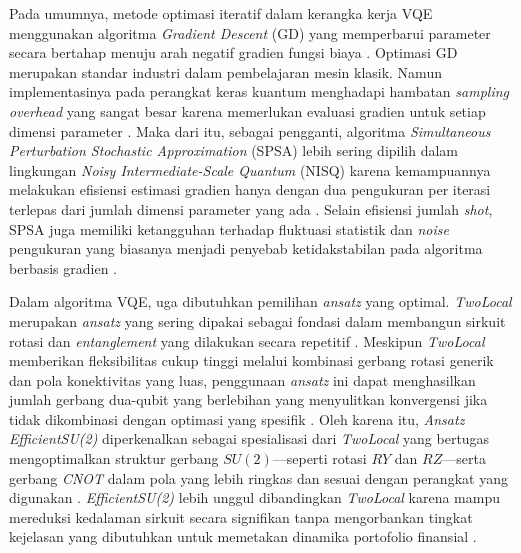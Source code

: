 Pada umumnya, metode optimasi iteratif dalam kerangka kerja VQE menggunakan algoritma \textit{Gradient Descent} (GD) yang memperbarui parameter secara bertahap menuju arah negatif gradien fungsi biaya \cite{wang_achieving_2025}. Optimasi GD merupakan standar industri dalam pembelajaran mesin klasik. Namun implementasinya pada perangkat keras kuantum menghadapi hambatan \textit{sampling overhead} yang sangat besar karena memerlukan evaluasi gradien untuk setiap dimensi parameter \cite{dao_exploring_2025}. Maka dari itu, sebagai pengganti, algoritma \textit{Simultaneous Perturbation Stochastic Approximation} (SPSA) lebih sering dipilih dalam lingkungan \textit{Noisy Intermediate-Scale Quantum} (NISQ) karena kemampuannya melakukan efisiensi estimasi gradien hanya dengan dua pengukuran per iterasi terlepas dari jumlah dimensi parameter yang ada \cite{wang_achieving_2025}. Selain efisiensi jumlah \textit{shot}, SPSA juga memiliki ketangguhan terhadap fluktuasi statistik dan \textit{noise} pengukuran yang biasanya menjadi penyebab ketidakstabilan pada algoritma berbasis gradien \cite{spall_implementation_1998}.

Dalam algoritma VQE, uga dibutuhkan pemilihan \textit{ansatz} yang optimal. \textit{TwoLocal} merupakan \textit{ansatz} yang sering dipakai sebagai fondasi dalam membangun sirkuit rotasi dan \textit{entanglement} yang dilakukan secara repetitif \cite{dao_exploring_2025}. Meskipun \textit{TwoLocal} memberikan fleksibilitas cukup tinggi melalui kombinasi gerbang rotasi generik dan pola konektivitas yang luas, penggunaan \textit{ansatz} ini dapat menghasilkan jumlah gerbang dua-qubit yang berlebihan yang menyulitkan konvergensi jika tidak dikombinasi dengan optimasi yang spesifik \cite{wang_achieving_2025}. Oleh karena itu, \textit{Ansatz EfficientSU(2)} diperkenalkan sebagai spesialisasi dari \textit{TwoLocal} yang bertugas mengoptimalkan struktur gerbang $SU(2)$—seperti rotasi $RY$ dan $RZ$—serta gerbang \textit{CNOT} dalam pola yang lebih ringkas dan sesuai dengan perangkat yang digunakan \cite{dao_exploring_2025}. \textit{EfficientSU(2)} lebih unggul dibandingkan \textit{TwoLocal} karena mampu mereduksi kedalaman sirkuit secara signifikan tanpa mengorbankan tingkat kejelasan yang dibutuhkan untuk memetakan dinamika portofolio finansial \cite{dao_exploring_2025}.

